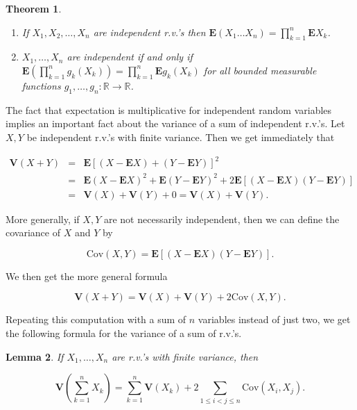 \documentclass[11pt]{report}
\newcommand{\R}{\mathbb{R}}
\theoremstyle{plain}
\newtheorem{thm}{Theorem}[chapter]
\newtheorem{lem}[thm]{Lemma}
\theoremstyle{definition}
\begin{document}
\begin{thm}

\begin{enumerate}[label=(\roman*)]
\item If $X_1,X_2,\ldots,X_n$ are independent r.v.'s then
$\mathbf{E}(X_1 \ldots X_n) = \prod_{k=1}^n
\mathbf{E} X_k$.

\item $X_1,\ldots,X_n$ are independent if and only if
$\mathbf{E}\left(\prod_{k=1}^n g_k(X_k)\right) =
\prod_{k=1}^n \mathbf{E} g_k(X_k)$
for all bounded measurable functions
$g_1,\ldots,g_n:\R\to\R$.
\end{enumerate}

\end{thm}

\noindent The fact that expectation is multiplicative for
independent random variables implies an important fact
about the variance of a sum of independent r.v.'s. Let
$X,Y$ be independent r.v.'s with finite variance.
Then we get immediately that

\begin{eqnarray*}
\mathbf{V}(X+Y) &=& \mathbf{E}\left[(X-\mathbf{E} X)+(Y-\mathbf{E} Y)\right]^2 \\ &=&
\mathbf{E}(X-\mathbf{E} X)^2 + \mathbf{E}(Y-\mathbf{E} Y)^2 +2 \mathbf{E}\left[ (X-\mathbf{E} X)(Y-\mathbf{E} Y)\right] \\
&=& \mathbf{V}(X)+\mathbf{V}(Y) + 0 = \mathbf{V}(X)+\mathbf{V}(Y).
\end{eqnarray*}

\noindent More generally, if $X,Y$ are not necessarily
independent, then we can define the covariance of $X$
and $Y$ by

\[
\textrm{Cov}(X,Y) = \mathbf{E}\left[ (X-\mathbf{E} X)(Y-\mathbf{E} Y)\right].
\]

\noindent We then get the more general formula

\[
\mathbf{V}(X+Y) = \mathbf{V}(X) + \mathbf{V}(Y) + 2 \textrm{Cov}(X,Y).
\]

\noindent Repeating this computation with a sum of $n$
variables instead of just two, we get the following
formula for the variance of a sum of r.v.'s.

\begin{lem}
If $X_1,\ldots,X_n$ are r.v.'s with finite variance,
then

\[
\mathbf{V}\left(\sum_{k=1}^n X_k\right) = \sum_{k=1}^n \mathbf{V}(X_k) + 2 \sum_{1\le i<j\le n} \textrm{Cov}(X_i,X_j).
\]

\end{lem}
\end{document}
